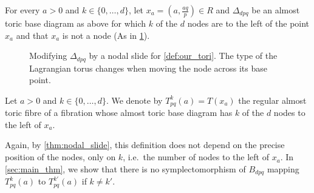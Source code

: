\documentclass[12pt,a4paper,abstract=true,draft]{scrartcl}
\begin{document}
For every $a > 0$ and $k \in \{0,\ldots,d\}$, let $x_a = \left( a,\frac{aq}{p} \right) \in R$ and $\Delta_{dpq}$ be an almost toric base diagram as above for which $k$ of the $d$ nodes are to the left of the point $x_a$ and that $x_a$ is not a node (As in \cref{fig:our_tori}).

\begin{figure}
  \centering
  \caption{Modifying $Δ_{dpq}$ by a nodal slide for \cref{def:our_tori}. The type of the Lagrangian torus changes when moving the node across its base point.}
  \label{fig:our_tori}
\end{figure}

\begin{definition}
  \label{def:our_tori}
    Let $a>0$ and $k \in \{0,\ldots,d\}$.
We denote by $T^k_{pq}(a) = T(x_a)$ the regular almost toric fibre of a fibration whose almost toric base diagram has $k$ of the $d$ nodes to the left of $x_a$. 
\end{definition}

Again, by \cref{thm:nodal_slide}, this definition does not depend on the precise position of the nodes, only on $k$, i.e.\ the number of nodes to the left of $x_a$.
In \cref{sec:main_thm}, we show that there is no symplectomorphism of $B_{dpq}$ mapping $T^k_{pq}(a)$ to $T^{k'}_{pq}(a)$ if $k \neq k'$.
\end{document}

